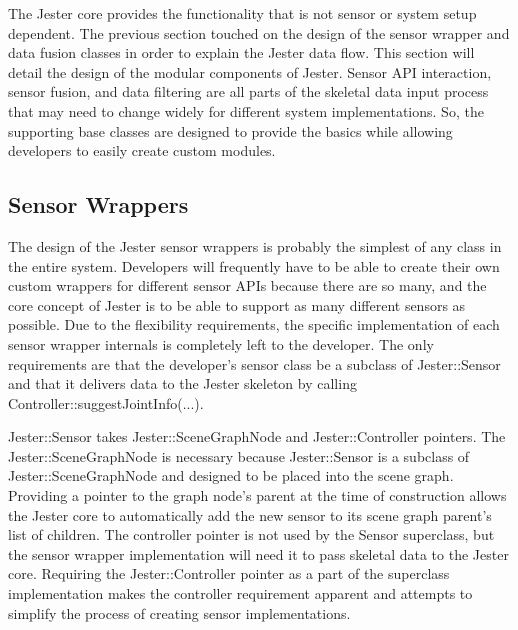 The Jester core provides the functionality that is not sensor or system setup dependent. The previous section touched on the design of the sensor wrapper and data fusion classes in order to explain the Jester data flow. This section will detail the design of the modular components of Jester. Sensor API interaction, sensor fusion, and data filtering are all parts of the skeletal data input process that may need to change widely for different system implementations. So, the supporting base classes are designed to provide the basics while allowing developers to easily create custom modules.

\subsection{Sensor Wrappers}\label{sec:sensor_wrappers}

The design of the Jester sensor wrappers is probably the simplest of any class in the entire system. Developers will frequently have to be able to create their own custom wrappers for different sensor APIs because there are so many, and the core concept of Jester is to be able to support as many different sensors as possible. Due to the flexibility requirements, the specific implementation of each sensor wrapper internals is completely left to the developer. The only requirements are that the developer's sensor class be a subclass of Jester::Sensor and that it delivers data to the Jester skeleton by calling Controller::suggestJointInfo(...). 

Jester::Sensor takes Jester::SceneGraphNode and Jester::Controller pointers. The Jester::SceneGraphNode is necessary because Jester::Sensor is a subclass of Jester::SceneGraphNode and designed to be placed into the scene graph. Providing a pointer to the graph node's parent at the time of construction allows the Jester core to automatically add the new sensor to its scene graph parent's list of children. The controller pointer is not used by the Sensor superclass, but the sensor wrapper implementation will need it to pass skeletal data to the Jester core. Requiring the Jester::Controller pointer as a part of the superclass implementation makes the controller requirement apparent and attempts to simplify the process of creating sensor implementations. 

